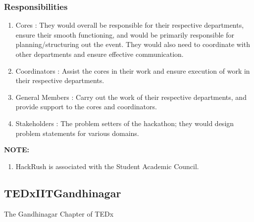 \documentclass[12pt]{article}
\begin{document}
\subsubsection{Responsibilities}
\begin{enumerate}
    \item Cores : They would overall be responsible for their respective departments, ensure their smooth functioning, and would be primarily responsible for planning/structuring out the event. They would also need to coordinate with other departments and ensure effective communication.
    \item Coordinators : Assist the cores in their work and ensure execution of work in their respective departments.
    \item General Members : Carry out the work of their respective departments, and provide support to the cores and coordinators.
    \item Stakeholders : The problem setters of the hackathon; they would design problem statements for various domains.
\end{enumerate}
\textbf{NOTE:} \begin{enumerate}
    \item HackRush is associated with the Student Academic Council.
\end{enumerate}

\subsection{TEDxIITGandhinagar}
The Gandhinagar Chapter of TEDx
\end{document}
